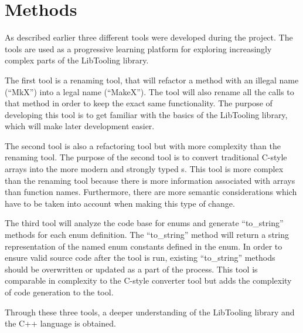 \chapter{Methods}

As described earlier three different tools were developed during the project. The tools are used as a progressive learning platform for exploring increasingly complex parts of the LibTooling library. 

The first tool is a renaming tool, that will refactor a method with an illegal name (``MkX'') into a legal name (``MakeX''). The tool will also rename all the calls to that method in order to keep the exact same functionality. The purpose of developing this tool is to get familiar with the basics of the LibTooling library, which will make later development easier. 

The second tool is also a refactoring tool but with more complexity than the renaming tool. The purpose of the second tool is to convert traditional C-style arrays into the more modern and strongly typed s. This tool is more complex than the renaming tool because there is more information associated with arrays than function names. Furthermore, there are more semantic considerations which have to be taken into account when making this type of change. 

The third tool will analyze the code base for enums and generate ``to\_string'' methods for each enum definition. The ``to\_string'' method will return a string representation of the named enum constants defined in the enum. In order to ensure valid source code after the tool is run, existing ``to\_string'' methods should be overwritten or updated as a part of the process. 
This tool is comparable in complexity to the C-style converter tool but adds the complexity of code generation to the tool. 

Through these three tools, a deeper understanding of the LibTooling library and the C++ language is obtained.